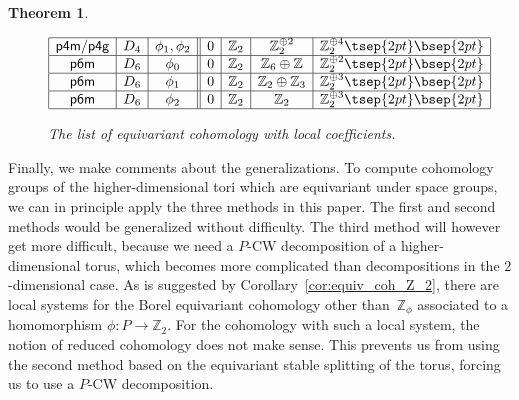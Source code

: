 \documentclass[pdftex]{sigma}
\newtheorem{thm}{Theorem}[section]
\theoremstyle{definition}
\newcommand{\Z}{\mathbb{Z}}
\begin{document}
\begin{thm}
\begin{figure}[htpb]
$$\begin{array}{|c|c|c||c|c|c|c|}
\hline
\mbox{\textsf{p4m}/\textsf{p4g}} & D_4 & \phi_1, \phi_2 &
0 & \Z_2 & \Z_2^{\oplus 2} & \Z_2^{\oplus 4} \tsep{2pt}\bsep{2pt}\\
\hline
\mbox{\textsf{p6m}} & D_6 & \phi_0 &
0 & \Z_2 & \Z_6 \oplus \Z & \Z_2^{\oplus 2} \tsep{2pt}\bsep{2pt}\\
\hline
\mbox{\textsf{p6m}} & D_6 & \phi_1 &
0 & \Z_2 & \Z_2 \oplus \Z_3 & \Z_2^{\oplus 3} \tsep{2pt}\bsep{2pt}\\
\hline
\mbox{\textsf{p6m}} & D_6 & \phi_2 &
0 & \Z_2 & \Z_2 & \Z_2^{\oplus 3} \tsep{2pt}\bsep{2pt}\\
\hline
\end{array}
$$
\caption{The list of equivariant cohomology with local coef\/f\/icients.} \label{fig:list_equiv_coh_twisted}
\end{figure}
\end{thm}

Finally, we make comments about the generalizations. To compute cohomology groups of the higher-dimensional tori which are equivariant under space groups, we can in principle apply the three methods in this paper. The f\/irst and second methods would be generalized without dif\/f\/iculty. The third method will however get more dif\/f\/icult, because we need a $P$-CW decomposition of a higher-dimensional torus, which becomes more complicated than decompositions in the $2$-dimensional case. As is suggested by Corollary~\ref{cor:equiv_coh_Z_2}, there are local systems for the Borel equivariant cohomology other than~$\Z_\phi$ associated to a homomorphism $\phi \colon P \to \Z_2$. For the cohomology with such a local system, the notion of reduced cohomology does not make sense. This prevents us from using the second method based on the equivariant stable splitting of the torus, forcing us to use a $P$-CW decomposition.
\end{document}
